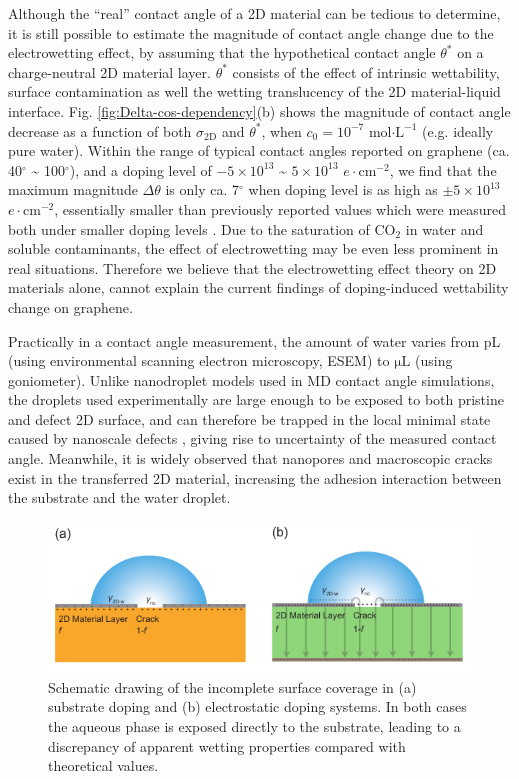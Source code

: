 \documentclass[aps,prl,reprint,groupedaddress,amsmath,amssymb, showpacs]{revtex4-1}
\begin{document}
Although the ``real'' contact angle of a 2D material can be tedious to
determine, it is still possible to estimate the magnitude of contact
angle change due to the electrowetting effect, by assuming that the
hypothetical contact angle \(\theta^{*}\) on a charge-neutral 2D
material layer. \(\theta^{*}\) consists of the effect of intrinsic
wettability, surface contamination as well the wetting translucency of
the 2D material-liquid interface. Fig. \ref{fig:Delta-cos-dependency}(b)
shows the magnitude of contact angle decrease as a function of both
\(\sigma_{\mathrm{2D}}\) and \(\theta^{*}\), when \(c_{0}=10^{-7}\)
mol\(\cdot \mathrm{L}^{-1}\) (e.g. ideally pure water). Within the range
of typical contact angles reported on graphene (ca. 40\(^{\circ}\) \textasciitilde{}
100\(^{\circ}\)), and a doping level of \(-5\times10^{13}\) \textasciitilde{}
\(5\times10^{13}\) \(e \cdot \mathrm{cm}^{-2}\), we find that the maximum
magnitude \(\Delta\theta\) is only ca. 7\(^{\circ}\) when doping level is
as high as \(\pm 5 \times 10^{13}\) \(e\cdot \mathrm{cm}^{-2}\),
essentially smaller than previously reported values which were
measured both under smaller doping levels
\cite{hong_mechanism_2016,ashraf_doping-induced_2016}.  Due to the
saturation of CO\(_{\text{2}}\) in water and soluble contaminants, the effect of
electrowetting may be even less prominent in real
situations. Therefore we believe that the electrowetting effect theory
on 2D materials alone, cannot explain the current findings of
doping-induced wettability change on graphene.


Practically in a contact angle measurement, the amount of water varies
from pL (using environmental scanning electron microscopy, ESEM) to
\(\mathrm{\mu L}\) (using goniometer). Unlike nanodroplet models used in
MD contact angle simulations, the droplets used experimentally are
large enough to be exposed to both pristine and defect 2D surface, and
can therefore be trapped in the local minimal state caused by nanoscale
defects \cite{raj_wettability_2013}, giving rise to uncertainty of the
measured contact angle. Meanwhile, it is widely observed that
nanopores and macroscopic cracks exist in the transferred 2D material,
increasing the adhesion interaction between the substrate and the
water droplet.

\begin{figure}[htbp]
\centering
\includegraphics[width=0.95\linewidth]{../img/scheme-crack.pdf}
\caption{\label{fig:scheme-crack}
Schematic drawing of the incomplete surface coverage in (a) substrate doping and (b) electrostatic doping systems. In both cases the aqueous phase is exposed directly to the substrate, leading to a discrepancy of apparent wetting properties compared with theoretical values.}
\end{figure}
\end{document}
